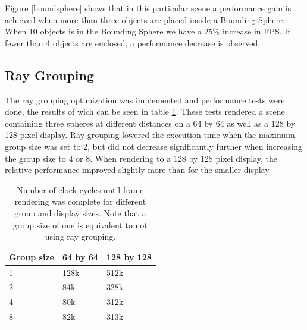 			Figure \ref{boundsphere} shows that in this particular scene a
			performance gain is achieved when more than three objects are
			placed inside a Bounding Sphere.  When 10 objects is in the
			Bounding Sphere we have a 25\% increase in FPS.  If fewer than 4
			objects are enclosed, a performance decrease is observed. 
		
		\subsection{Ray Grouping}
			
			The ray grouping optimization was implemented and performance tests
			were done, the results of wich can be seen in table
			\ref{grouptable}. These tests rendered a scene containing three
			spheres at different distances on a 64 by 64 as well as a 128 by 128
			pixel display. Ray grouping lowered the execution time when the
			maximum group size was set to 2, but did not decrease significantly
			further when increasing the group size to 4 or 8. When rendering to
			a 128 by 128 pixel display, the relative performance improved
			slightly more than for the smaller display.

			\begin{table}[h]
			\centering
			\begin{tabular}{lll}
				\hline
				Group size & 64 by 64 & 128 by 128 \\
				\hline
				1          & 128k     &  512k      \\
				2          & 84k      &  328k      \\
				4          & 80k      &  312k      \\
				8          & 82k      &  313k      \\
				\hline
			\end{tabular}
			\caption{Number of clock cycles until frame rendering was complete
				for different group and display sizes. Note that a group size 
				of one is equivalent to not using ray grouping.}
			\label{grouptable}
			\end{table}
